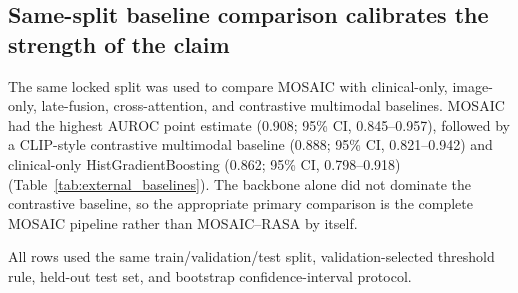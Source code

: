 \subsection{Same-split baseline comparison calibrates the strength of the claim}
\label{subsec:external_baseline_results}

The same locked split was used to compare MOSAIC with clinical-only, image-only, late-fusion, cross-attention, and contrastive multimodal baselines. MOSAIC had the highest AUROC point estimate (0.908; 95\% CI, 0.845--0.957), followed by a CLIP-style contrastive multimodal baseline (0.888; 95\% CI, 0.821--0.942) and clinical-only HistGradientBoosting (0.862; 95\% CI, 0.798--0.918) (Table~\ref{tab:external_baselines}). The backbone alone did not dominate the contrastive baseline, so the appropriate primary comparison is the complete MOSAIC pipeline rather than MOSAIC--RASA by itself.

\begin{table}[!htbp]
  \centering
  \caption{Same-split comparison with external baselines on the locked held-out test set.}
  \label{tab:external_baselines}
  \scriptsize
  \begin{threeparttable}
  \begin{tablenotes}[flushleft]
    \footnotesize
    \item All rows used the same train/validation/test split, validation-selected threshold rule, held-out test set, and bootstrap confidence-interval protocol.
  \end{tablenotes}
  \end{threeparttable}
\end{table}

